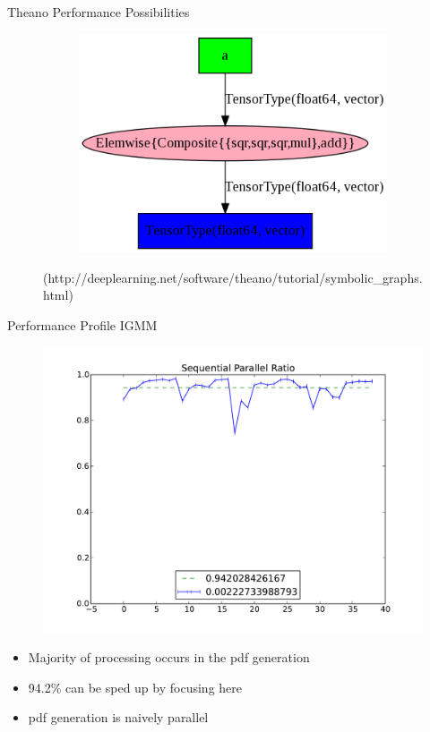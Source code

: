 \documentclass{beamer}
\begin{document}
\begin{frame}{Theano Performance Possibilities}
\begin{figure}
\begin{subfigure}
  \centering \includegraphics[scale=.20]{doc/fgraphop}
  \end{subfigure}
  \caption{(http://deeplearning.net/software/theano/tutorial/symbolic\_graphs.html)}
  \end{figure}
  \end{frame}
  

\begin{frame}{Performance Profile IGMM}
   \begin{figure}
  \centering \includegraphics[scale=.30]{doc/seqpar}
  \end{figure}
  \begin{itemize}
   \item Majority of processing occurs in the pdf generation
   \item 94.2\% can be sped up by focusing here
   \item pdf generation is naively parallel
  \end{itemize}
\end{frame}
\end{document}
